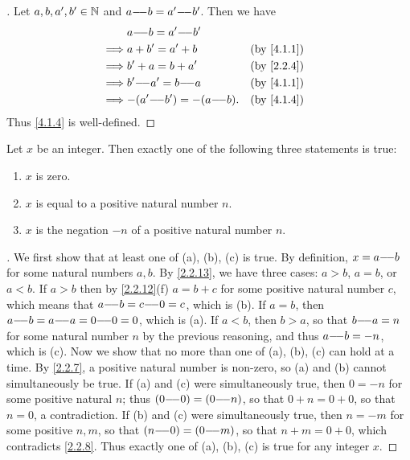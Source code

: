 \begin{proof}[]
  Let \(a, b, a', b' \in \mathbb{N}\) and \(a {-}\!{-} b = a' {-}\!{-} b'\).
  Then we have
  \begin{align*}
             & a \mm b = a' \mm b'                          \\
    \implies & a + b' = a' + b              &  & \by{4.1.1} \\
    \implies & b' + a = b + a'              &  & \by{2.2.4} \\
    \implies & b' \mm a' = b \mm a          &  & \by{4.1.1} \\
    \implies & {-}(a' \mm b') = -(a \mm b). &  & \by{4.1.4}
  \end{align*}
  Thus \cref{4.1.4} is well-defined.
\end{proof}

\begin{lem}\label{4.1.5}
  Let \(x\) be an integer.
  Then exactly one of the following three statements is true:
  \begin{enumerate}
    \item \(x\) is zero.
    \item \(x\) is equal to a positive natural number \(n\).
    \item \(x\) is the negation \(-n\) of a positive natural number \(n\).
  \end{enumerate}
\end{lem}

\begin{proof}[]
  We first show that at least one of (a), (b), (c) is true.
  By definition, \(x = a {-}\!{-} b\) for some natural numbers \(a, b\).
  By \cref{2.2.13}, we have three cases: \(a > b\), \(a = b\), or \(a < b\).
  If \(a > b\) then by \cref{2.2.12}(f) \(a = b + c\) for some positive natural number \(c\), which means that \(a {-}\!{-} b = c {-}\!{-} 0 = c\), which is (b).
  If \(a = b\), then \(a {-}\!{-} b = a {-}\!{-} a = 0 {-}\!{-} 0 = 0\), which is (a).
  If \(a < b\), then \(b > a\), so that \(b {-}\!{-} a = n\) for some natural number \(n\) by the previous reasoning, and thus \(a {-}\!{-} b = -n\), which is (c).
  Now we show that no more than one of (a), (b), (c) can hold at a time.
  By \cref{2.2.7}, a positive natural number is non-zero, so (a) and (b) cannot simultaneously be true.
  If (a) and (c) were simultaneously true, then \(0 = -n\) for some positive natural \(n\);
  thus \((0 {-}\!{-} 0) = (0 {-}\!{-} n)\), so that \(0 + n = 0 + 0\), so that \(n = 0\), a contradiction.
  If (b) and (c) were simultaneously true, then \(n = -m\) for some positive \(n, m\), so that \((n {-}\!{-} 0) = (0 {-}\!{-} m)\), so that \(n + m = 0 + 0\), which contradicts \cref{2.2.8}.
  Thus exactly one of (a), (b), (c) is true for any integer \(x\).
\end{proof}

